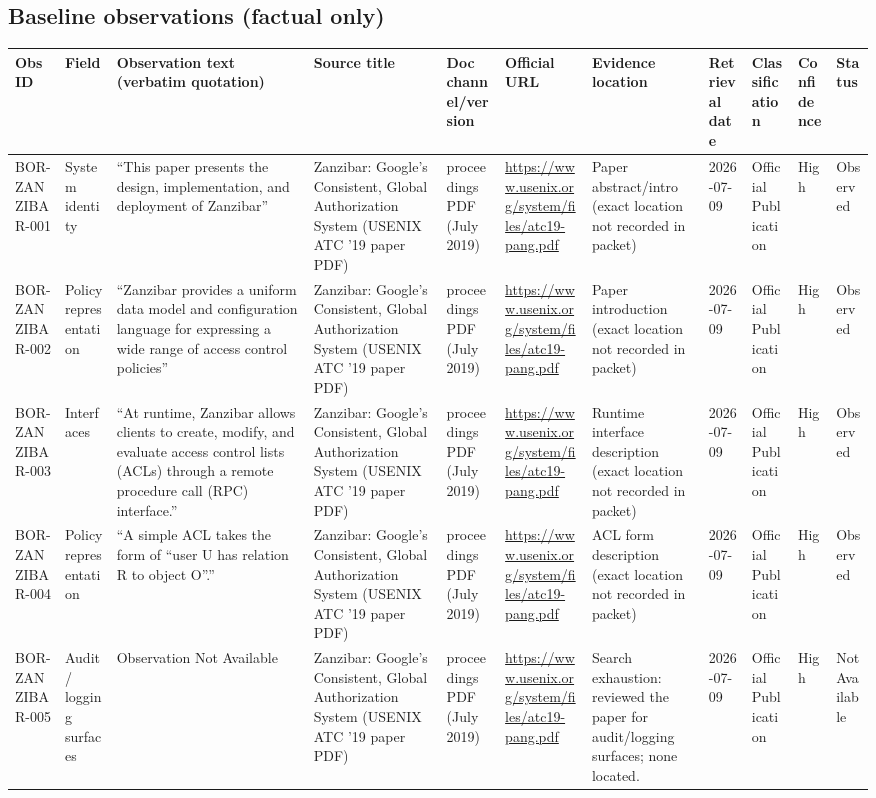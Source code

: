 \documentclass[11pt]{article}
\begin{document}
\subsection*{Baseline observations (factual only)}
\begin{longtable}{@{}L{0.95in}L{1.05in}L{2.05in}L{1.55in}L{0.95in}L{1.55in}L{1.10in}L{0.75in}L{0.95in}L{0.75in}L{0.8in}@{}}
\toprule
Obs ID & Field & Observation text (verbatim quotation) & Source title & Doc channel/version & Official URL & Evidence location & Retrieval date & Classification & Confidence & Status\\
\midrule
\endhead
BOR-ZANZIBAR-001 & System identity & ``This paper presents the design, implementation, and deployment of Zanzibar'' & Zanzibar: Google’s Consistent, Global Authorization System (USENIX ATC '19 paper PDF) & proceedings PDF (July 2019) & \url{https://www.usenix.org/system/files/atc19-pang.pdf} & Paper abstract/intro (exact location not recorded in packet) & 2026-07-09 & Official Publication & High & Observed\\
BOR-ZANZIBAR-002 & Policy representation & ``Zanzibar provides a uniform data model and configuration language for expressing a wide range of access control policies'' & Zanzibar: Google’s Consistent, Global Authorization System (USENIX ATC '19 paper PDF) & proceedings PDF (July 2019) & \url{https://www.usenix.org/system/files/atc19-pang.pdf} & Paper introduction (exact location not recorded in packet) & 2026-07-09 & Official Publication & High & Observed\\
BOR-ZANZIBAR-003 & Interfaces & ``At runtime, Zanzibar allows clients to create, modify, and evaluate access control lists (ACLs) through a remote procedure call (RPC) interface.'' & Zanzibar: Google’s Consistent, Global Authorization System (USENIX ATC '19 paper PDF) & proceedings PDF (July 2019) & \url{https://www.usenix.org/system/files/atc19-pang.pdf} & Runtime interface description (exact location not recorded in packet) & 2026-07-09 & Official Publication & High & Observed\\
BOR-ZANZIBAR-004 & Policy representation & ``A simple ACL takes the form of ``user U has relation R to object O''.'' & Zanzibar: Google’s Consistent, Global Authorization System (USENIX ATC '19 paper PDF) & proceedings PDF (July 2019) & \url{https://www.usenix.org/system/files/atc19-pang.pdf} & ACL form description (exact location not recorded in packet) & 2026-07-09 & Official Publication & High & Observed\\
BOR-ZANZIBAR-005 & Audit / logging surfaces & Observation Not Available & Zanzibar: Google’s Consistent, Global Authorization System (USENIX ATC '19 paper PDF) & proceedings PDF (July 2019) & \url{https://www.usenix.org/system/files/atc19-pang.pdf} & Search exhaustion: reviewed the paper for audit/logging surfaces; none located. & 2026-07-09 & Official Publication & High & Not Available\\
\bottomrule
\end{longtable}
\end{document}
